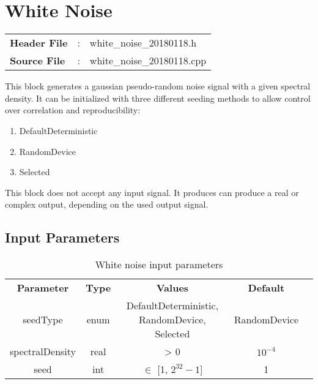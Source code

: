 \clearpage

\section{White Noise}

\begin{tcolorbox}	
	\begin{tabular}{p{2.75cm} p{0.2cm} p{10.5cm}} 	
		\textbf{Header File}   &:& white\_noise\_20180118.h \\
		\textbf{Source File}   &:& white\_noise\_20180118.cpp \\
	\end{tabular}
\end{tcolorbox}

\maketitle
This block generates a gaussian pseudo-random noise signal with a given spectral density. It can be initialized with three different seeding methods to allow control over correlation and reproducibility:

\begin{enumerate}
	\item DefaultDeterministic
	\item RandomDevice
	\item Selected
\end{enumerate}

This block does not accept any input signal. It produces can produce a real or complex output, depending on the used output signal.

\subsection*{Input Parameters}

\begin{table}[h]
	\centering
	\begin{tabular}{|c|c|c|c|c}
		\cline{1-4}
		\textbf{Parameter} & \textbf{Type} &\textbf{Values} &   \textbf{Default}& \\ \cline{1-4}
		seedType 		 & enum & DefaultDeterministic, RandomDevice, Selected & RandomDevice \\ \cline{1-4}
		spectralDensity  & real & > 0  			& $10^{-4}$ \\ \cline{1-4}
		seed 	   		 & int & $\in$ [1, $2^{32}-1$] 	& 1 \\ \cline{1-4} \cline{1-4}
	\end{tabular}
	\caption{White noise input parameters}
	\label{table:bin_sour_in_par}
\end{table}

